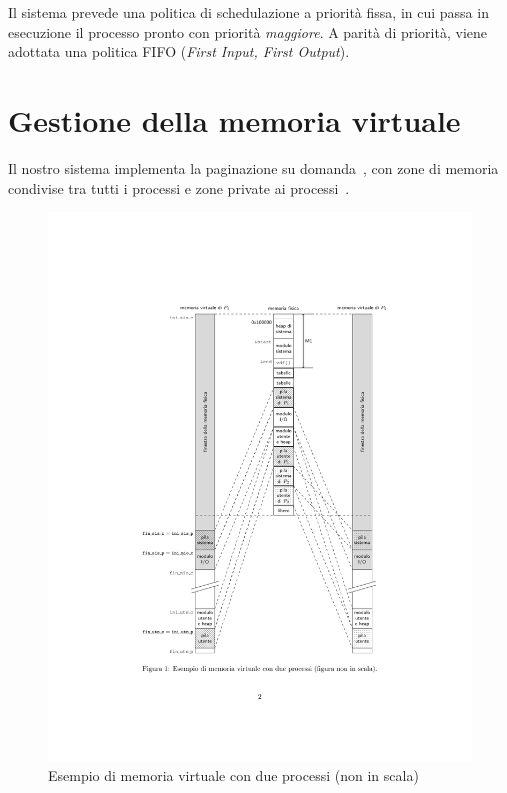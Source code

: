 Il sistema prevede una politica di schedulazione a priorità fissa, in cui passa in esecuzione il processo pronto con priorità \emph{maggiore}. A parità di priorità, viene adottata una politica FIFO (\emph{First Input, First Output}).

\section{Gestione della memoria virtuale}
\label{sec:nucleo-memoria}
Il nostro sistema implementa la paginazione su domanda~\cite{lettieri:paginazione-su-domanda}, con zone di memoria condivise tra tutti i processi e zone private ai processi~\cite{lettieri:paginazione-nel-nucleo}.

\begin{figure}
	\centering
	\includegraphics[width=\textwidth]{"img/memoria-virtuale-nucleo.pdf"}
	\caption{Esempio di memoria virtuale con due processi (non in scala)~\cite{lettieri:paginazione-nel-nucleo}}
	\label{fig:memoria-virtuale-nucleo}
\end{figure}

